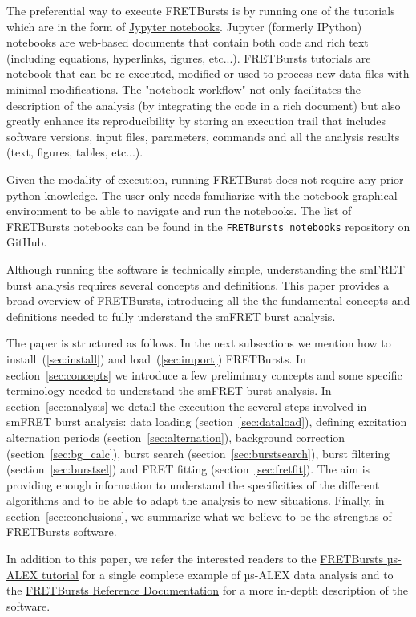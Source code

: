 The preferential way to execute FRETBursts is by running one of the tutorials 
which are in the form of \href{http://ipython.org/notebook.html}{Jypyter notebooks}.
Jupyter (formerly IPython) notebooks are web-based documents that contain both 
code and rich text (including equations, hyperlinks, figures, etc...).
FRETBursts tutorials are notebook that can be re-executed,
modified or used to process new data files with minimal modifications.
The "notebook workflow"\cite{Shen_2014} not only facilitates 
the description of the analysis (by integrating the code in a rich document)
but also greatly enhance its reproducibility by storing an execution trail
that includes software versions, input files, parameters, commands and all
the analysis results (text, figures, tables, etc...).

Given the modality of execution, running FRETBurst does not require
any prior python knowledge. The user only needs familiarize with the
notebook graphical environment to be able to navigate and run the notebooks.
The list of FRETBursts notebooks can be found in the 
\verb|FRETBursts_notebooks| repository on GitHub.

Although running the software is technically simple, understanding the smFRET 
burst analysis requires several concepts and definitions.
This paper provides a broad overview of FRETBursts, introducing all the
the fundamental concepts and definitions needed to fully understand the 
smFRET burst analysis. 

The paper is structured as follows. 
In the next subsections we mention how to install~(\ref{sec:install}) and 
load~(\ref{sec:import}) FRETBursts.
In section~\ref{sec:concepts} we
introduce a few preliminary concepts and some specific terminology needed 
to understand the smFRET burst analysis. 
In section~\ref{sec:analysis} we detail the execution the several steps involved
in smFRET burst analysis: data loading (section~\ref{sec:dataload}), defining 
excitation alternation periods (section~\ref{sec:alternation}), background 
correction (section~\ref{sec:bg_calc}), burst search (section~\ref{sec:burstsearch}), 
burst filtering (section~\ref{sec:burstsel}) and FRET fitting (section~\ref{sec:fretfit}).
The aim is providing enough information to understand the specificities of 
the different algorithms and to be able to adapt the analysis to new situations.
Finally, in section~\ref{sec:conclusions}, we summarize what we believe to be
the strengths of FRETBursts software.

In addition to this paper, we refer the interested readers to the 
\href{http://nbviewer.ipython.org/github/tritemio/FRETBursts_notebooks/blob/master/notebooks/FRETBursts\%20-\%20us-ALEX\%20smFRET\%20burst\%20analysis.ipynb}{FRETBursts µs-ALEX tutorial} 
for a single complete example of µs-ALEX data analysis and to the
\href{http://fretbursts.readthedocs.org/}{FRETBursts Reference Documentation}
for a more in-depth description of the software.

